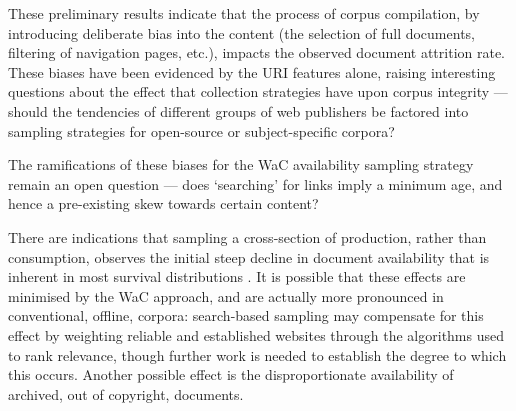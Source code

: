 



These preliminary results indicate that the process of corpus compilation, by introducing deliberate bias into the content  (the selection of full documents, filtering of navigation pages, etc.), impacts the observed document attrition rate.  These biases have been evidenced by the URI features alone, raising interesting questions about the effect that collection strategies have upon corpus integrity --- should the tendencies of different groups of web publishers be factored into sampling strategies for open-source or subject-specific corpora?

The ramifications of these biases for the WaC availability sampling strategy remain an open question --- does `searching' for links imply a minimum age, and hence a pre-existing skew towards certain content?

There are indications that sampling a cross-section of production, rather than consumption, observes the initial steep decline in document availability that is inherent in most survival distributions%
.  It is possible that these effects are minimised by the WaC approach, and are actually more pronounced in conventional, offline, corpora: search-based sampling may compensate for this effect by weighting reliable and established websites through the algorithms used to rank relevance, though further work is needed to establish the degree to which this occurs.  Another possible effect is the disproportionate availability of archived, out of copyright, documents.


